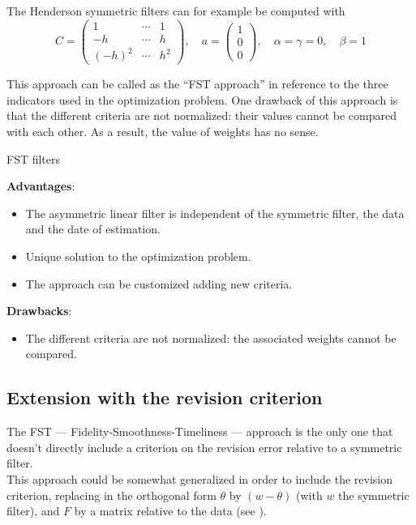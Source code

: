 \documentclass[
  12pt,
  ,
  a4paper]{article}
\providecommand{\tightlist}{%
  \setlength{\itemsep}{0pt}\setlength{\parskip}{0pt}}
\newcommand\1{\mathds{1}}
\begin{document}
The Henderson symmetric filters can for example be computed with
\[C=\begin{pmatrix}
1 & \cdots&1\\
-h & \cdots&h \\
(-h)^2 & \cdots&h^2
\end{pmatrix},\quad
a=\begin{pmatrix}
1 \\0\\0
\end{pmatrix},\quad
\alpha=\gamma=0,\quad
\beta=1\]

This approach can be called as the ``FST approach'' in reference to the three indicators used in the optimization problem.
One drawback of this approach is that the different criteria are not normalized: their values cannot be compared with each other.
As a result, the value of weights has no sense.

\begin{summary}{FST filters}

\textbf{Advantages}:

\begin{itemize}
\item
  The asymmetric linear filter is independent of the symmetric filter, the data and the date of estimation.
\item
  Unique solution to the optimization problem.
\item
  The approach can be customized adding new criteria.
\end{itemize}

\textbf{Drawbacks}:

\begin{itemize}
\tightlist
\item
  The different criteria are not normalized: the associated weights cannot be compared.
\end{itemize}

\end{summary}

\hypertarget{extension-with-the-revision-criterion}{%
\subsection{Extension with the revision criterion}\label{extension-with-the-revision-criterion}}

The FST --- Fidelity-Smoothness-Timeliness --- approach is the only one that doesn't directly include a criterion on the revision error relative to a symmetric filter.\\
This approach could be somewhat generalized in order to include the revision criterion, replacing in the orthogonal form \(\theta\) by \((w-\theta)\) (with \(w\) the symmetric filter), and \(F\) by a matrix relative to the data (see \textcite{ch12HBSA}).
\end{document}
